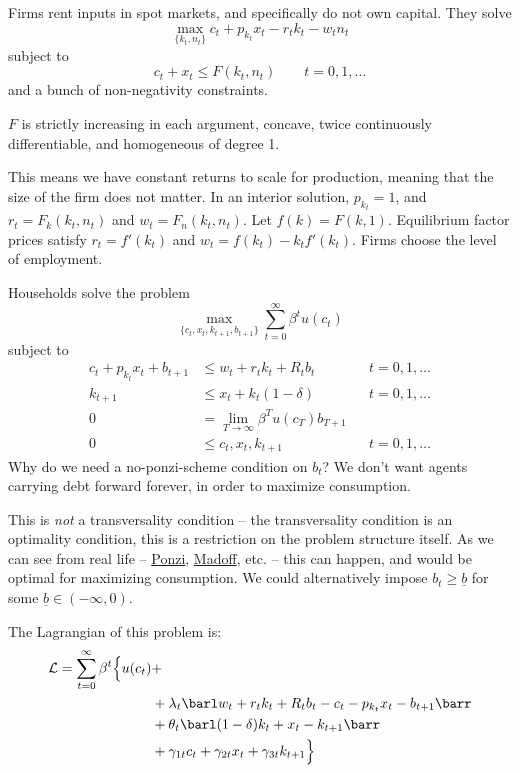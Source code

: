 \documentclass[10pt]{article}
\begin{document}
\begin{model}
	 Firms rent inputs in spot markets, and specifically do not own capital. They solve \[\max_{\{k_t,n_t\}}c_t + p_{k_t}x_t - r_tk_t - w_tn_t\] subject to \[c_t + x_t \le F(k_t,n_t) \qquad t = 0,1,\dots\] and a bunch of non-negativity constraints. 
	
	\begin{assumption}
		$F$ is strictly increasing in each argument, concave, twice continuously differentiable, and homogeneous of degree 1.
	\end{assumption}
	This means we have constant returns to scale for production, meaning that the size of the firm does not matter. In an interior solution, $p_{k_t} = 1$, and $r_t = F_k(k_t,n_t)$ and $w_t = F_n(k_t,n_t)$. Let $f(k) = F(k,1)$. Equilibrium factor prices satisfy $r_t = f'(k_t)$ and $w_t = f(k_t) - k_tf'(k_t)$. Firms choose the level of employment.
	
	Households solve the problem \[\max_{\{c_t,x_t,k_{t+1},b_{t+1}\}} \sum_{t=0}^\infty \beta^t u(c_t)\] subject to \begin{align*} c_t + p_{k_t} x_t + b_{t+1} &\le w_t + r_tk_t + R_tb_t &&t = 0,1,\dots \\k_{t+1} &\le x_t + k_t(1-\delta) &&t = 0,1,\dots \\0 &= \lim_{T\to\infty} \beta^T u(c_T) b_{T+1} \\ 0 &\le c_t,x_t,k_{t+1} &&t=0,1,\dots \end{align*} Why do we need a no-ponzi-scheme condition on $b_t$? We don't want agents carrying debt forward forever, in order to maximize consumption. 
	\begin{remark}
		This is \emph{not} a transversality condition -- the transversality condition is an optimality condition, this is a restriction on the problem structure itself. As we can see from real life -- \href{https://en.wikipedia.org/wiki/Charles_Ponzi}{Ponzi}, \href{https://en.wikipedia.org/wiki/Bernie_Madoff}{Madoff}, etc. -- this can happen, and would be optimal for maximizing consumption. We could alternatively impose $b_t \ge \underline{b}$ for some $\underline{b} \in (-\infty,0)$.
	\end{remark}
	The Lagrangian of this problem is:
	\begin{align*}
		\mathcal{L} = \sum_{t=0}^\infty \beta^t \Big\{u(c_t) &+ \\
		&+ \lambda_t \barl w_t + r_tk_t + R_tb_t - c_t - p_{k_t}x_t - b_{t+1}\barr \\
		&+ \theta_t \barl (1-\delta)k_t + x_t - k_{t+1}\barr \\
		&+ \gamma_{1t}c_t + \gamma_{2t} x_t + \gamma_{3t} k_{t+1} \Big\}
	\end{align*}
	

\end{model}
\end{document}
